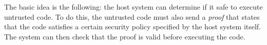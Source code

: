 \documentclass{article}
\begin{document}
 The basic idea is the following: the host system  can determine if it safe to execute untrusted code. To do this, the untrusted code must also 
 send a \emph{proof} that states that the code satisfies a certain security policy specified by the host system itself. The system can then check that the proof is valid before executing the code.

 
\end{document}
